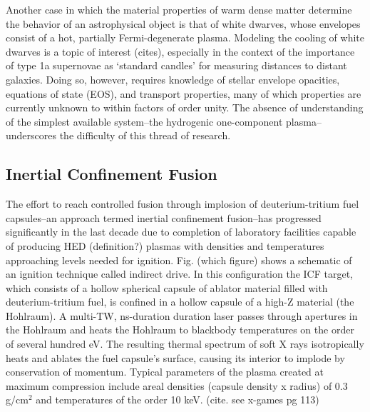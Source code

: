\documentclass [11pt, proquest, article] {uwthesis}[2016/11/22]
\begin{document}

Another case in which the material properties of warm dense matter determine the behavior of an astrophysical object is that of white dwarves, whose envelopes consist of a hot, partially Fermi-degenerate plasma. Modeling the cooling of white dwarves is a topic of interest (cites), especially in the context of the importance of type 1a supernovae as `standard candles' for measuring distances to distant galaxies. Doing so, however, requires knowledge of stellar envelope opacities, equations of state (EOS), and transport properties, many of which properties are currently unknown to within factors of order unity. The absence of understanding of the simplest available system--the hydrogenic one-component plasma--underscores the difficulty of this thread of research.

\subsection{Inertial Confinement Fusion}
The effort to reach controlled fusion through implosion of deuterium-tritium fuel capsules--an approach termed inertial confinement fusion--has progressed significantly in the last decade due to completion of laboratory facilities capable of producing HED (definition?) plasmas with densities and temperatures approaching levels needed for ignition. Fig. (which figure) shows a schematic of an ignition technique called indirect drive. In this configuration the ICF target, which consists of a hollow spherical capsule of ablator material filled with deuterium-tritium fuel, is confined in a hollow capsule of a high-Z material (the Hohlraum). A multi-TW, ns-duration duration laser passes through apertures in the Hohlraum and heats the Hohlraum to blackbody temperatures on the order of several hundred eV. The resulting thermal spectrum of soft X rays isotropically heats and ablates the fuel capsule's surface, causing its interior to implode by conservation of momentum. Typical parameters of the plasma created at maximum compression include areal densities (capsule density x radius) of 0.3 g/cm$^2$ and temperatures of the order 10 keV. (cite. see x-games pg 113)
\end{document}
